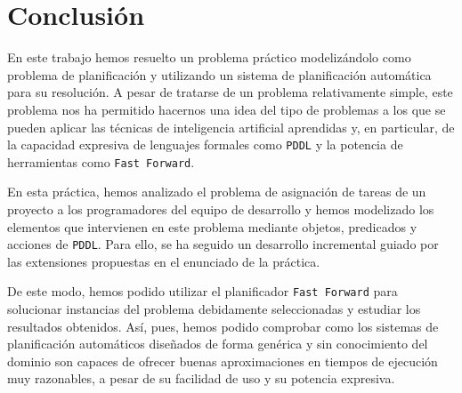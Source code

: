 
\section{Conclusión} \label{sec:conclusion}

En este trabajo hemos resuelto un problema práctico modelizándolo como 
problema de planificación y utilizando un sistema de planificación automática
para su resolución. A pesar de tratarse de un problema relativamente simple, 
este problema nos ha permitido hacernos una idea del tipo de problemas a los 
que se pueden aplicar las técnicas de inteligencia artificial aprendidas y, 
en particular, de la capacidad expresiva de lenguajes formales como 
\texttt{PDDL} y la potencia de herramientas como \texttt{Fast Forward}.

En esta práctica, hemos analizado el problema de asignación de tareas de un 
proyecto a los programadores del equipo de desarrollo y hemos modelizado los 
elementos que intervienen en este problema mediante objetos, predicados y 
acciones de \texttt{PDDL}. Para ello, se ha seguido un desarrollo incremental 
guiado por las extensiones propuestas en el enunciado de la práctica. 

De este modo, hemos podido utilizar el planificador \texttt{Fast Forward} para 
solucionar instancias del problema debidamente seleccionadas y estudiar los 
resultados obtenidos. Así, pues, hemos podido comprobar como los sistemas de 
planificación automáticos diseñados de forma genérica y sin conocimiento del 
dominio son capaces de ofrecer buenas aproximaciones en tiempos de ejecución 
muy razonables, a pesar de su facilidad de uso y su potencia expresiva.


\clearpage

